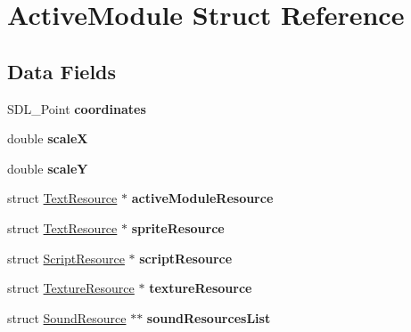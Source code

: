 \hypertarget{struct_active_module}{}\section{Active\+Module Struct Reference}
\label{struct_active_module}
\subsection*{Data Fields}
\begin{DoxyCompactItemize}
\item 
\hypertarget{struct_active_module_a667ad041f76f3b99c2ea65cd78b668ea}{}\label{struct_active_module_a667ad041f76f3b99c2ea65cd78b668ea} 
S\+D\+L\+\_\+\+Point {\bfseries coordinates}
\item 
\hypertarget{struct_active_module_af04d6c916584bdddd6a334359ff1059d}{}\label{struct_active_module_af04d6c916584bdddd6a334359ff1059d} 
double {\bfseries scaleX}
\item 
\hypertarget{struct_active_module_a936cc64e631dcd2b4ea124d5d8d4fe38}{}\label{struct_active_module_a936cc64e631dcd2b4ea124d5d8d4fe38} 
double {\bfseries scaleY}
\item 
\hypertarget{struct_active_module_a50bda08c677a498b9baa928d94ef3745}{}\label{struct_active_module_a50bda08c677a498b9baa928d94ef3745} 
struct \hyperlink{struct_text_resource}{Text\+Resource} $\ast$ {\bfseries active\+Module\+Resource}
\item 
\hypertarget{struct_active_module_ac402150bd2243d7a6f04756f7b624fa1}{}\label{struct_active_module_ac402150bd2243d7a6f04756f7b624fa1} 
struct \hyperlink{struct_text_resource}{Text\+Resource} $\ast$ {\bfseries sprite\+Resource}
\item 
\hypertarget{struct_active_module_abc27117170d75eb9af11c98fd2d5d855}{}\label{struct_active_module_abc27117170d75eb9af11c98fd2d5d855} 
struct \hyperlink{struct_script_resource}{Script\+Resource} $\ast$ {\bfseries script\+Resource}
\item 
\hypertarget{struct_active_module_aedd0da0c072332f83e64105f8682bbdf}{}\label{struct_active_module_aedd0da0c072332f83e64105f8682bbdf} 
struct \hyperlink{struct_texture_resource}{Texture\+Resource} $\ast$ {\bfseries texture\+Resource}
\item 
\hypertarget{struct_active_module_a1eb76005d8836f5ffd80e3da1ca83988}{}\label{struct_active_module_a1eb76005d8836f5ffd80e3da1ca83988} 
struct \hyperlink{struct_sound_resource}{Sound\+Resource} $\ast$$\ast$ {\bfseries sound\+Resources\+List}
\item 
$$
\end{DoxyCompactItemize}
